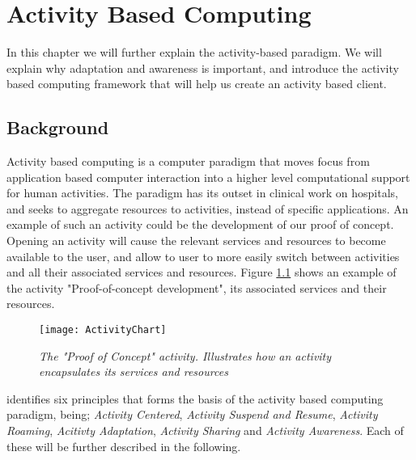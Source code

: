 \chapter{Activity Based Computing}

In this chapter we will further explain the activity-based paradigm. We will explain why adaptation and awareness is important, and introduce the activity based computing framework that will help us create an activity based client.

\section{Background}
Activity based computing is a computer paradigm that moves focus from application based computer interaction into a higher level computational support for human activities. The paradigm has its outset in clinical work on hospitals, and seeks to aggregate resources to activities, instead of specific applications. An example of such an activity could be the development of our proof of concept. Opening an activity will cause the relevant services and resources to become available to the user, and allow to user to more easily switch between activities and all their associated services and resources. Figure \ref{fig:activitychart} shows an example of the activity "Proof-of-concept development", its associated services and their resources.

\begin{figure}[h!]
  \centering
    \texttt{[image: ActivityChart]}
  \caption{\emph{The "Proof of Concept" activity. Illustrates how an activity encapsulates its services and resources}}
  \label{fig:activitychart}
\end{figure}

\citet{bardram2011} identifies six principles that forms the basis of the activity based computing paradigm, being; \emph{Activity Centered}, \emph{Activity Suspend and Resume}, \emph{Activity Roaming}, \emph{Acitivty Adaptation}, \emph{Activity Sharing} and \emph{Activity Awareness}. Each of these will be further described in the following.

